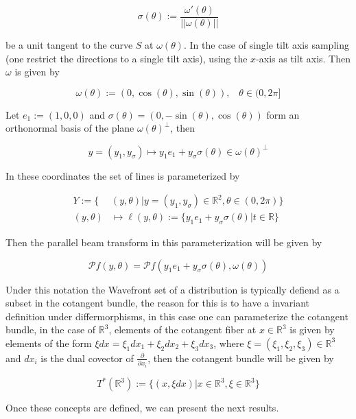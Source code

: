 \documentclass[a4paper]{article}
\begin{document}
$$
\sigma(\theta):= \frac{\omega'(\theta)}{||\omega(\theta)||}
$$

be a unit tangent to the curve $S$ at $\omega(\theta)$. In the case of single tilt axis sampling (one restrict the directions to a single tilt axis), using the $x$-axis as tilt axis. Then $\omega$ is given by

$$
\omega(\theta):=(0,\cos(\theta),\sin(\theta)) \text{,}\quad \theta\in (0,2\pi]
$$

\bigskip

Let $e_1:=(1,0,0)$ and $\sigma(\theta)=(0,-\sin(\theta),\cos(\theta))$ form an orthonormal basis of the plane $\omega(\theta)^{\perp}$, then

$$
y=(y_1,y_{\sigma})\mapsto y_1e_1+y_{\sigma}\sigma(\theta)\in \omega(\theta)^{\perp}
$$

\bigskip

In these coordinates the set of lines is parameterized by

$$
\begin{aligned}
Y:=\{&(y,\theta)| y=(y_1,y_{\sigma})\in \mathbb{R}^2, \theta\in (0,2\pi)\}\\
(y,\theta)&\mapsto \ell(y,\theta):=\{ y_1e_1+y_{\sigma}\sigma(\theta)| t\in\mathbb{R}\}
\end{aligned}
$$

\bigskip

Then the parallel beam transform in this parameterization will be given by

$$
\mathcal{P}f(y,\theta)=\mathcal{P}f(y_1e_1+y_{\sigma}\sigma(\theta),\omega(\theta))
$$

\bigskip

Under this notation the Wavefront set of a distribution is typically defiend as a subset in the cotangent bundle, the reason for this is to have a invariant definition under differmorphisms, in this case one can parameterize the cotangent bundle, in the case of $\mathbb{R}^3$, elements of the cotangent fiber at $x\in \mathbb{R}^3$ is given by elements of the form $\xi dx= \xi_1dx_1+\xi_2dx_2+\xi_3dx_3$, where $\xi=(\xi_1,\xi_2,\xi_3)\in \mathbb{R}^3$ and $dx_i$ is the dual covector of $\frac{\partial}{\partial x_i}$, then the cotangent bundle will be given by

$$
T^*(\mathbb{R}^3):=\{(x,\xi dx)|x\in\mathbb{R}^3,\xi\in\mathbb{R}^3\}
$$

\bigskip

Once these concepts are defined, we can present the next results.

\bigskip
\end{document}

